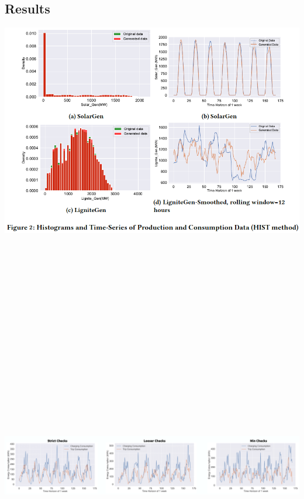 \documentclass{article}
\begin{document}
\begin{multicols}{3}
\section*{Results}
\vspace{-.5cm}
\noindent         \includegraphics[width=\linewidth]{figures/hist-c}

\vspace{3cm}
$\mbox{     }$\\
$\mbox{     }$\\
$\mbox{     }$\\
$\mbox{     }$\\
$\mbox{     }$\\
$\mbox{     }$\\
$\mbox{     }$\\
$\mbox{     }$\\
$\mbox{     }$\\
$\mbox{     }$\\
$\mbox{     }$\\
$\mbox{     }$\\
$\mbox{     }$\\
$\mbox{     }$\\
$\mbox{     }$\\
$\mbox{     }$\\
\addtocounter{figure}{+2}
\noindent         \includegraphics[width=\linewidth]{figures/data}


\end{multicols}
\end{document}
